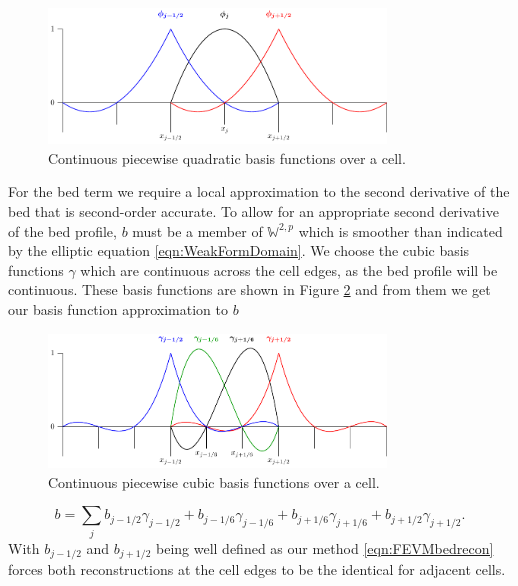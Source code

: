 \begin{figure}
	\centering
	\includegraphics[width=0.8\textwidth]{./chp3/figures/P2.pdf}
	\caption{Continuous piecewise quadratic basis functions over a cell.}
	\label{fig:P2ContBasis}
\end{figure}

For the bed term we require a local approximation to the second derivative of the bed that is second-order accurate. To allow for an appropriate second derivative of the bed profile, $b$ must be a member of $\mathbb{W}^{2,p}$ which is smoother than indicated by the elliptic equation \eqref{eqn:WeakFormDomain}. We choose the cubic basis functions $\gamma$ which are continuous across the cell edges, as the bed profile will be continuous. These basis functions are shown in Figure \ref{fig:P3ContBasis} and from them we get our basis function approximation to $b$
\begin{figure}
	\centering
	\includegraphics[width=0.8\textwidth]{./chp3/figures/P3.pdf}
	\caption{Continuous piecewise cubic basis functions over a cell.}
	\label{fig:P3ContBasis}
\end{figure}
\begin{equation}
b = \sum_j b_{j-1/2}\gamma_{j-1/2} + b_{j-1/6}\gamma_{j-1/6}  + b_{j+1/6}\gamma_{j+1/6} + b_{j+1/2}\gamma_{j+1/2}.
\label{eqn:FEapproxtob}
\end{equation}
With $b_{j-1/2}$ and $b_{j+1/2}$ being well defined as our method \eqref{eqn:FEVMbedrecon} forces both reconstructions at the cell edges to be the identical for adjacent cells. 

